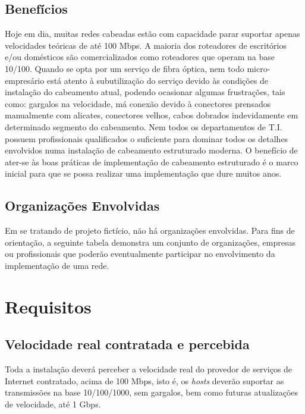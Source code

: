 \documentclass[	DIV=calc,%
							paper=a4,%
							fontsize=12pt,%
							onecolumn]{scrartcl}	 					%
\begin{document}
\subsection{Benefícios}
Hoje em dia, muitas redes cabeadas estão com capacidade parar suportar apenas velocidades teóricas de até 100 Mbps. A maioria dos roteadores de escritórios e/ou domésticos são comercializados como roteadores que operam na base 10/100. Quando se opta por um serviço de fibra óptica, nem todo micro-empresário está atento à subutilização do serviço devido às condições de instalação do cabeamento atual, podendo ocasionar algumas frustrações, tais como: gargalos na velocidade, má conexão devido à conectores prensados manualmente com alicates, conectores velhos, cabos dobrados indevidamente em determinado segmento do cabeamento. Nem todos os departamentos de T.I. possuem profissionais qualificados o suficiente para dominar todos os detalhes envolvidos numa instalação de cabeamento estruturado moderna. O benefício de ater-se às boas práticas de implementação de cabeamento estruturado é o marco inicial para que se possa realizar uma implementação que dure muitos anos.

\subsection{Organizações Envolvidas}
Em se tratando de projeto fictício, não há organizações envolvidas. Para fins de orientação, a seguinte tabela demonstra um conjunto de organizações, empresas ou profissionais que poderão eventualmente participar no envolvimento da implementação de uma rede.\\






\section{Requisitos}

\subsection{Velocidade real contratada e percebida}
Toda a instalação deverá perceber a velocidade real do provedor de serviços de Internet contratado, acima de 100 Mbps, isto é, os \textit{hosts} deverão suportar as transmissões na base 10/100/1000, sem gargalos, bem como futuras atualizações de velocidade, até 1 Gbps.
\end{document}

